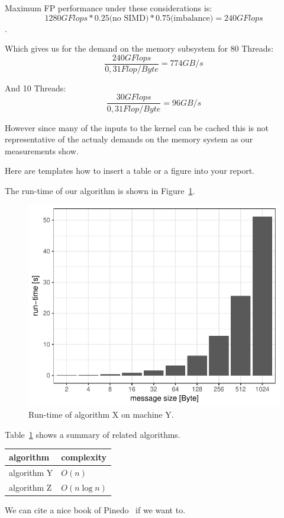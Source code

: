 Maximum FP performance under these considerations is:
$$1280 GFlops * 0.25 \text{(no SIMD)}  * 0.75 \text{(imbalance)} = 240 GFlops$$.

Which gives us for the demand on the memory subsystem for 80 Threads:
$$\frac{240 GFlops}{0,31 Flop/Byte} = 774 GB/s$$

And 10 Threads:
$$\frac{30 GFlops}{0,31 Flop/Byte} = 96 GB/s$$

However since many of the inputs to the kernel can be cached this is not representative of the actualy demands on the memory system as our measurements show.

















\newpage

Here are templates how to insert a table or a figure into your report.

The run-time of our algorithm is shown in Figure~\ref{fig:runtime}.

\begin{figure}[ht]
\centering
\includegraphics[width=.5\linewidth]{figures/runtime}
\caption{Run-time of algorithm X on machine Y.}
\label{fig:runtime}
\end{figure}


Table~\ref{tab:related_algorithms} shows a summary of related algorithms.

\begin{table}[ht]
\centering
{}
\label{tab:related_algorithms}
\begin{tabular}{ll}
\toprule 
algorithm & complexity \\
\midrule
algorithm Y & $O(n)$ \\
algorithm Z & $O(n \log{n} )$ \\
\bottomrule
\end{tabular}
\end{table}

We can cite a nice book of Pinedo~\cite{Pinedo:2008vs} if we want to.
